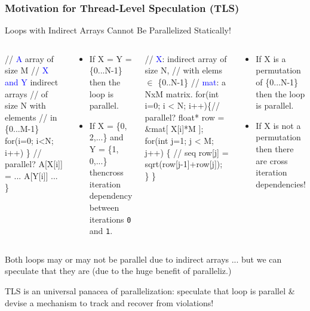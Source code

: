 \documentclass{beamer}
\newcommand{\blue}[1]{\textcolor{Blue}{{#1}}}
\newcommand{\emp}[1]{\textcolor{DikuRed}{ #1}}
\newcommand{\emphh}[1]{\textcolor{CosGreen}{ #1}}
\newcommand{\mymath}[1]{$ #1 $}
\begin{document}
\begin{frame}[fragile,t]
  \frametitle{Motivation for Thread-Level Speculation (TLS)}

\begin{block}{Loops with Indirect Arrays Cannot Be Parallelized Statically!}
\begin{columns}
\begin{colorcode}
// \blue{A} array of size M
// \blue{X and Y} indirect arrays
//   of size N with elements
//   in \{0...M-1\} 
for(i=0; i<N; i++) \} // \emphh{parallel?}
    A[X[i]] = ... A[Y[i]] ...
\}
\end{colorcode}
\begin{scriptsize}
\begin{itemize}
\item If X = Y = \{0...N-1\}\\\pause
        then the loop is parallel.
\item If X = \{0, 2,...\} and Y = \{1, 0,...\}
        then\pause {\tt~}cross
        iteration dependency between iterations
        {\tt 0} and {\tt 1}. 
\end{itemize}
\end{scriptsize}
\begin{colorcode}
// \blue{X}: indirect array of size N,
//   with elems \mymath{\in} \{0..N-1\}
// \blue{mat}: a NxM matrix. 
for(int i=0; i < N; i++)\{//\emphh{parallel?}
  float* row = &mat[ X[i]*M ];
  for(int j=1; j < M; j++) \{ //\emp{seq}
    row[j] = sqrt(row[j-1]+row[j]);
\} \}
\end{colorcode}
\begin{scriptsize}
\begin{itemize}
\item If X is a permutation of \{0...N-1\}\\\pause
        then the loop is parallel.
\item If X is not a permutation then there
        are cross iteration dependencies!
\end{itemize}
\end{scriptsize}
\end{columns}
\end{block} 

Both loops may or may not be parallel due to indirect
arrays ... but we can \alert{speculate} that they are 
(due to the huge benefit of paralleliz.)
\medskip

\emphh{TLS is an universal panacea of parallelization:
speculate that loop is parallel \& devise a mechanism
to track and recover from violations!}

\end{frame}
\end{document}
